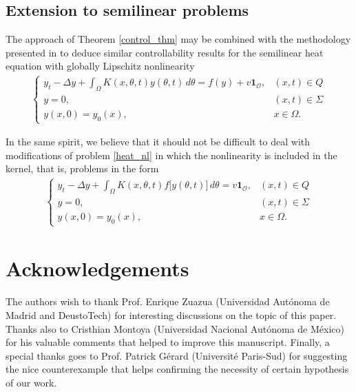 \documentclass{amsart}    %
\newcommand{\D}{\displaystyle}
\begin{document}
\subsection{Extension to semilinear problems}

The approach of Theorem \ref{control_thm} may be combined with the methodology presented in \cite{fabre1995approximate,fernandez1997null} to deduce similar controllability results for the semilinear heat equation with globally Lipschitz nonlinearity  
\begin{align}\label{heat_nl}
	\begin{cases}
		\D y_t - \Delta y + \int_\Omega K(x,\theta,t)y(\theta,t)\,d\theta = f(y) + v\mathbf{1}_{\mathcal O}, & (x,t)\in Q
		\\
		y = 0, & (x,t)\in\Sigma
		\\
		y(x,0) = y_0(x), & x\in\Omega.
	\end{cases}
\end{align}

In the same spirit, we believe that it should not be difficult to deal with modifications of problem \eqref{heat_nl} in which the nonlinearity is included in the kernel, that is, problems in the form
\begin{align*}
	\begin{cases}
		\D y_t - \Delta y + \int_\Omega K(x,\theta,t)f\big[y(\theta,t)\big]\,d\theta = v\mathbf{1}_{\mathcal O}, & (x,t)\in Q
		\\
		y = 0, & (x,t)\in\Sigma
		\\
		y(x,0) = y_0(x), & x\in\Omega.
	\end{cases}
\end{align*}

\section{Acknowledgements} 
The authors wish to thank Prof. Enrique Zuazua (Universidad Aut\'onoma de Madrid and DeustoTech) for interesting discussions on the topic of this paper. Thanks also to Cristhian Montoya (Universidad Nacional Aut\'onoma de M\'exico) for his valuable comments that helped to improve this manuscript. Finally, a special thanks goes to Prof. Patrick G\'erard (Universit\'e Paris-Sud) for suggesting the nice counterexample that helps confirming the necessity of certain hypothesis of our work.
\end{document}
